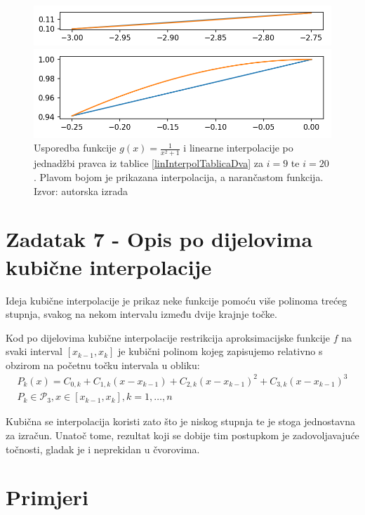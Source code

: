 \documentclass[12pt,a4paper]{report}
\begin{document}
			\begin{figure}[H]
				\centering
				
					\includegraphics[width=\textwidth]{slike/usporedba58.png}
				
					\includegraphics[width=\textwidth]{slike/usporedba519.png}
				
				\caption{Usporedba funkcije $g(x)=\frac{1}{x^2 +1}$ i linearne interpolacije po jednadžbi pravca iz tablice \ref{linInterpolTablicaDva} za $i=9$ te $i=20$. Plavom bojom je prikazana interpolacija, a narančastom funkcija. Izvor: autorska izrada}
				\label{linInterSlika2}
			\end{figure}
			
	\section{Zadatak 7 - Opis po dijelovima kubične interpolacije}
	Ideja kubične interpolacije je prikaz neke funkcije pomoću više polinoma trećeg stupnja, svakog na nekom intervalu između dvije krajnje točke.
	
	Kod po dijelovima kubične interpolacije restrikcija aproksimacijske funkcije $f$ na svaki interval $[x_{k-1},x_k]$ je kubični polinom kojeg zapisujemo relativno s obzirom na početnu točku intervala u obliku:
	\begin{align*}
		P_k(x)=C_{0,k}+C_{1,k}(x-x_{k-1})+C_{2,k}(x-x_{k-1})^2+C_{3,k}
		(x-x_{k-1})^3\\
		P_k\in \mathcal{P}_3, x\in [x_{k-1}, x_k], k=1,\ldots,n
	\end{align*}
	
	Kubična se interpolacija koristi zato što je niskog stupnja te je stoga jednostavna za izračun. Unatoč tome, rezultat koji se dobije tim postupkom je zadovoljavajuće točnosti, gladak je i neprekidan u čvorovima.
	
	\section{Primjeri}
\end{document}
